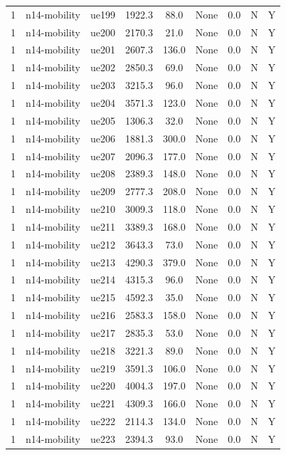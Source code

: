 \begin{table}[ht]
\begin{tabular}{|c|c|c|c|c|c|c|c|c|}
1 & n14-mobility & ue199 & 1922.3 & 88.0 & None & 0.0 & N & Y \\
1 & n14-mobility & ue200 & 2170.3 & 21.0 & None & 0.0 & N & Y \\
1 & n14-mobility & ue201 & 2607.3 & 136.0 & None & 0.0 & N & Y \\
1 & n14-mobility & ue202 & 2850.3 & 69.0 & None & 0.0 & N & Y \\
1 & n14-mobility & ue203 & 3215.3 & 96.0 & None & 0.0 & N & Y \\
1 & n14-mobility & ue204 & 3571.3 & 123.0 & None & 0.0 & N & Y \\
1 & n14-mobility & ue205 & 1306.3 & 32.0 & None & 0.0 & N & Y \\
1 & n14-mobility & ue206 & 1881.3 & 300.0 & None & 0.0 & N & Y \\
1 & n14-mobility & ue207 & 2096.3 & 177.0 & None & 0.0 & N & Y \\
1 & n14-mobility & ue208 & 2389.3 & 148.0 & None & 0.0 & N & Y \\
1 & n14-mobility & ue209 & 2777.3 & 208.0 & None & 0.0 & N & Y \\
1 & n14-mobility & ue210 & 3009.3 & 118.0 & None & 0.0 & N & Y \\
1 & n14-mobility & ue211 & 3389.3 & 168.0 & None & 0.0 & N & Y \\
1 & n14-mobility & ue212 & 3643.3 & 73.0 & None & 0.0 & N & Y \\
1 & n14-mobility & ue213 & 4290.3 & 379.0 & None & 0.0 & N & Y \\
1 & n14-mobility & ue214 & 4315.3 & 96.0 & None & 0.0 & N & Y \\
1 & n14-mobility & ue215 & 4592.3 & 35.0 & None & 0.0 & N & Y \\
1 & n14-mobility & ue216 & 2583.3 & 158.0 & None & 0.0 & N & Y \\
1 & n14-mobility & ue217 & 2835.3 & 53.0 & None & 0.0 & N & Y \\
1 & n14-mobility & ue218 & 3221.3 & 89.0 & None & 0.0 & N & Y \\
1 & n14-mobility & ue219 & 3591.3 & 106.0 & None & 0.0 & N & Y \\
1 & n14-mobility & ue220 & 4004.3 & 197.0 & None & 0.0 & N & Y \\
1 & n14-mobility & ue221 & 4309.3 & 166.0 & None & 0.0 & N & Y \\
1 & n14-mobility & ue222 & 2114.3 & 134.0 & None & 0.0 & N & Y \\
1 & n14-mobility & ue223 & 2394.3 & 93.0 & None & 0.0 & N & Y \\

\end{tabular}
\end{table}
